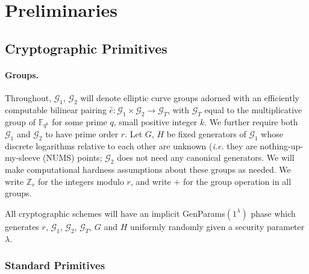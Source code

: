 \documentclass[letterpaper]{article}
\newcommand{\e}{\hat{e}}
\begin{document}
\section{Preliminaries}

\subsection{Cryptographic Primitives}

\paragraph{Groups.} Throughout, $\mathcal{G}_1$, $\mathcal{G}_2$ will denote
elliptic curve groups adorned with an efficiently computable bilinear pairing
$\e:\mathcal{G}_1\times\mathcal{G}_2\to\mathcal{G}_T$, with $\mathcal{G}_T$
equal to the multiplicative group of $\mathbb{F}_{q^k}$ for some prime $q$,
small positive integer $k$. We further require both $\mathcal{G}_1$ and
$\mathcal{G}_2$ to have prime order $r$. Let $G$, $H$ be fixed generators of
$\mathcal{G}_1$ whose discrete logarithms relative to each other are unknown
(\emph{i.e.} they are nothing-up-my-sleeve (NUMS) points; $\mathcal{G}_2$
does not need any canonical generators. We will make computational hardness
assumptions about these groups as needed. We write $\mathbb{Z}_r$
for the integers modulo $r$, and write $+$ for the group operation in all
groups.

All cryptographic schemes will have an implicit \textrm{GenParams}$(1^\lambda)$
phase which generates $r$, $\mathcal{G}_1$, $\mathcal{G}_2$, $\mathcal{G}_T$,
$G$ and $H$ uniformly randomly given a security parameter $\lambda$.

\subsubsection{Standard Primitives}
\end{document}
